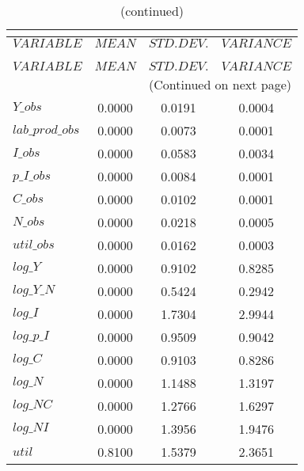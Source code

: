  
\begin{center}
\begin{longtable}{lccc} 
\caption{THEORETICAL MOMENTS}\\
 \label{Table:th_moments}\\
\toprule 
$VARIABLE        $	 & 	 $         MEAN$	 & 	 $    STD. DEV.$	 & 	 $     VARIANCE$\\
\midrule \endfirsthead 
\caption{(continued)}\\
 \toprule \\ 
$VARIABLE        $	 & 	 $         MEAN$	 & 	 $    STD. DEV.$	 & 	 $     VARIANCE$\\
\midrule \endhead 
\midrule \multicolumn{4}{r}{(Continued on next page)} \\ \bottomrule \endfoot 
\bottomrule \endlastfoot 
$Y\_obs          $	 & 	       0.0000	 & 	       0.0191	 & 	       0.0004 \\ 
$lab\_prod\_obs  $	 & 	       0.0000	 & 	       0.0073	 & 	       0.0001 \\ 
$I\_obs          $	 & 	       0.0000	 & 	       0.0583	 & 	       0.0034 \\ 
$p\_I\_obs       $	 & 	       0.0000	 & 	       0.0084	 & 	       0.0001 \\ 
$C\_obs          $	 & 	       0.0000	 & 	       0.0102	 & 	       0.0001 \\ 
$N\_obs          $	 & 	       0.0000	 & 	       0.0218	 & 	       0.0005 \\ 
$util\_obs       $	 & 	       0.0000	 & 	       0.0162	 & 	       0.0003 \\ 
$log\_Y          $	 & 	       0.0000	 & 	       0.9102	 & 	       0.8285 \\ 
$log\_Y\_N       $	 & 	       0.0000	 & 	       0.5424	 & 	       0.2942 \\ 
$log\_I          $	 & 	       0.0000	 & 	       1.7304	 & 	       2.9944 \\ 
$log\_p\_I       $	 & 	       0.0000	 & 	       0.9509	 & 	       0.9042 \\ 
$log\_C          $	 & 	       0.0000	 & 	       0.9103	 & 	       0.8286 \\ 
$log\_N          $	 & 	       0.0000	 & 	       1.1488	 & 	       1.3197 \\ 
$log\_NC         $	 & 	       0.0000	 & 	       1.2766	 & 	       1.6297 \\ 
$log\_NI         $	 & 	       0.0000	 & 	       1.3956	 & 	       1.9476 \\ 
${util}          $	 & 	       0.8100	 & 	       1.5379	 & 	       2.3651 \\ 
\end{longtable}
 \end{center}
